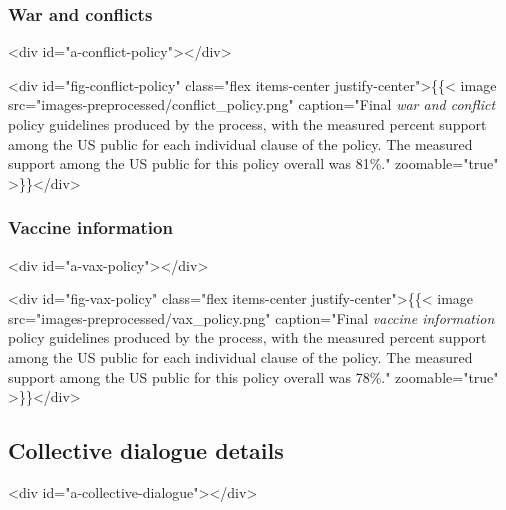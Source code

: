 \documentclass{article}
\begin{document}
\subsubsection{War and conflicts}<div id="a-conflict-policy"></div>

<div id="fig-conflict-policy" class="flex items-center justify-center">\{\{< image src="images-preprocessed/conflict_policy.png" caption="Final \emph{war and conflict} policy guidelines produced by the process, with the measured percent support among the US public for each individual clause of the policy. The measured support among the US public for this policy overall was 81\%." zoomable="true" >\}\}</div>



\subsubsection{Vaccine information}<div id="a-vax-policy"></div>

<div id="fig-vax-policy" class="flex items-center justify-center">\{\{< image src="images-preprocessed/vax_policy.png" caption="Final \emph{vaccine information} policy guidelines produced by the process, with the measured percent support among the US public for each individual clause of the policy. The measured support among the US public for this policy overall was 78\%." zoomable="true" >\}\}</div>



\subsection{Collective dialogue details}<div id="a-collective-dialogue"></div>
\end{document}

